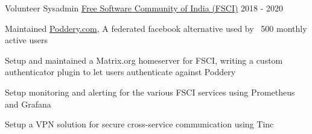 \begin{cventries}
    
    \cventry
    {Volunteer Sysadmin} %
    {\href{https://fsci.in}{Free Software Community of India (FSCI)}} %
    {} %
    {2018 - 2020} %
    {
      \begin{cvitems} %
        \item {Maintained \href{https://poddery.com}{Poddery.com}, A federated facebook alternative used by ~500 monthly active users}
        \item {Setup and maintained a Matrix.org homeserver for FSCI, writing a custom authenticator plugin to let users authenticate against Poddery}
        \item {Setup monitoring and alerting for the various FSCI services using Prometheus and Grafana}
        \item {Setup a VPN solution for secure cross-service communication using Tinc}
      \end{cvitems}
    }
\end{cventries}
